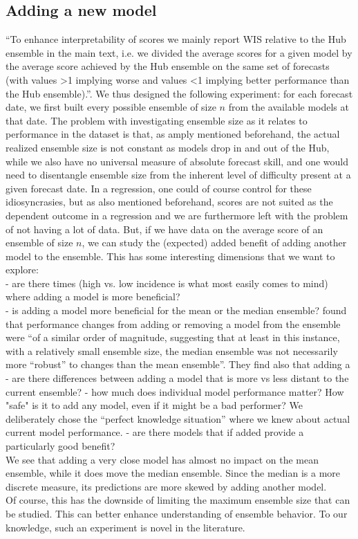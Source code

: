 \subsection{Adding a new model}
``To enhance
interpretability of scores we mainly report WIS relative to the Hub ensemble in the main text, i.e. we divided
the average scores for a given model by the average score achieved by the Hub ensemble on the same set of
forecasts (with values >1 implying worse and values <1 implying better performance than the Hub ensemble).''\cite{bosse_comparing_2021-1}.
We thus designed the following experiment: for each forecast date, we first built every possible ensemble of size $n$ from the available models at that date. The problem with investigating ensemble size as it relates to performance in the dataset is that, as amply mentioned beforehand, the actual realized ensemble size is not constant as models drop in and out of the Hub, while we also have no universal measure of absolute forecast skill, and one would need to disentangle ensemble size from the inherent level of difficulty present at a given forecast date. In a regression, one could of course control for these idiosyncrasies, but as also mentioned beforehand, scores are not suited as the dependent outcome in a regression and we are furthermore left with the problem of not having a lot of data. But, if we have data on the average score of an ensemble of size $n$, we can study the (expected) added benefit of adding another model to the ensemble. This has some interesting dimensions that we want to explore:\\
- are there times (high vs. low incidence is what most easily comes to mind) where adding a model is more beneficial?\\
- is adding a model more beneficial for the mean or the median ensemble? \cite{bosse_comparing_2021-1} found that performance changes from adding or removing a model from the ensemble were ``of a similar order of magnitude, suggesting that at least in this instance, with a relatively small ensemble size, the median ensemble was not necessarily more ``robust'' to changes than the mean ensemble''. They find also that adding a 
- are there differences between adding a model that is more vs less distant to the current ensemble?
- how much does individual model performance matter? How "safe" is it to add any model, even if it might be a bad performer? We deliberately chose the ``perfect knowledge situation'' where we knew about actual current model performance. 
- are there models that if added provide a particularly good benefit?\\
We see that adding a very close model has almost no impact on the mean ensemble, while it does move the median ensemble. Since the median is a more discrete measure, its predictions are more skewed by adding another model. \\
Of course, this has the downside of limiting the maximum ensemble size that can be studied. This can better enhance understanding of ensemble behavior. To our knowledge, such an experiment is novel in the literature. 


